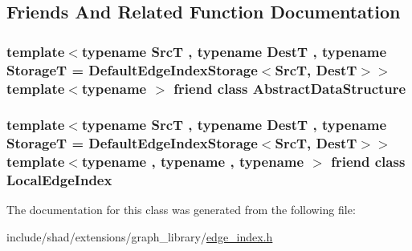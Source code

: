 \subsection{Friends And Related Function Documentation}
\hypertarget{classshad_1_1EdgeIndex_ab18afa4496cc863ddc11bab94b2adf57}{
\subsubsection[{Abstract\-Data\-Structure}]{\setlength{\rightskip}{0pt plus 5cm}template$<$typename Src\-T , typename Dest\-T , typename Storage\-T  = Default\-Edge\-Index\-Storage$<$\-Src\-T, Dest\-T$>$$>$ template$<$typename $>$ friend class {\bf Abstract\-Data\-Structure}\hspace{0.3cm}{\ttfamily [friend]}}}\label{classshad_1_1EdgeIndex_ab18afa4496cc863ddc11bab94b2adf57}
\hypertarget{classshad_1_1EdgeIndex_afc8d107f39c9ea0b8848ea970eb36b93}{
\subsubsection[{Local\-Edge\-Index}]{\setlength{\rightskip}{0pt plus 5cm}template$<$typename Src\-T , typename Dest\-T , typename Storage\-T  = Default\-Edge\-Index\-Storage$<$\-Src\-T, Dest\-T$>$$>$ template$<$typename , typename , typename $>$ friend class {\bf Local\-Edge\-Index}\hspace{0.3cm}{\ttfamily [friend]}}}\label{classshad_1_1EdgeIndex_afc8d107f39c9ea0b8848ea970eb36b93}


The documentation for this class was generated from the following file\-:\begin{DoxyCompactItemize}
\item 
include/shad/extensions/graph\-\_\-library/\hyperlink{edge__index_8h}{edge\-\_\-index.\-h}\end{DoxyCompactItemize}

